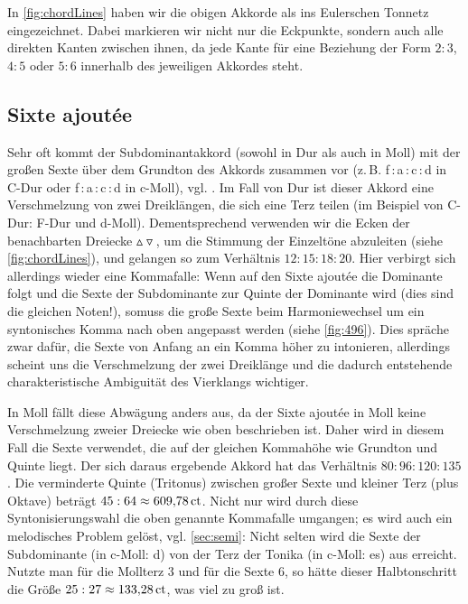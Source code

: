 In \cref{fig:chordLines} haben wir die obigen Akkorde als ins Eulerschen Tonnetz
eingezeichnet. Dabei markieren wir nicht nur die Eckpunkte, sondern auch alle
direkten Kanten zwischen ihnen, da jede Kante für eine Beziehung der Form $2:3$,
$4:5$ oder $5:6$ innerhalb des jeweiligen Akkordes steht.

\subsection{Sixte ajoutée}
\label{sec:sixte}

Sehr oft kommt der Subdominantakkord (sowohl in Dur als auch in Moll) mit der
großen Sexte über dem Grundton des Akkords zusammen vor
(z.\,B. f\,:\,a\,:\,c\,:\,d in C-Dur oder f\,:\,\flat a\,:\,c\,:\,d in c-Moll),
vgl. \cite[{}9.3]{Skript}.  Im Fall von Dur ist dieser Akkord eine Verschmelzung
von zwei Dreiklängen, die sich eine Terz teilen (im Beispiel von C-Dur: F-Dur
und d-Moll). Dementsprechend verwenden wir die Ecken der benachbarten Dreiecke
$\vartriangle\!\!\!\triangledown$, um die Stimmung der Einzeltöne abzuleiten
(siehe \cref{fig:chordLines}), und gelangen so zum Verhältnis
$12:15:18:20$. Hier verbirgt sich allerdings wieder eine Kommafalle: Wenn auf
den Sixte ajoutée die Dominante folgt und die Sexte der Subdominante zur Quinte
der Dominante wird (dies sind die gleichen Noten!), somuss die große Sexte beim
Harmoniewechsel um ein syntonisches Komma nach oben angepasst werden (siehe
\cref{fig:496}).  Dies spräche zwar dafür, die Sexte von Anfang an ein Komma
höher zu intonieren, allerdings scheint uns die Verschmelzung der zwei
Dreiklänge und die dadurch entstehende charakteristische Ambiguität des
Vierklangs wichtiger.

In Moll fällt diese Abwägung anders aus, da der Sixte ajoutée in Moll keine
Verschmelzung zweier Dreiecke wie oben beschrieben ist.  Daher wird in diesem
Fall die Sexte verwendet, die auf der gleichen Kommahöhe wie Grundton und Quinte
liegt. Der sich daraus ergebende Akkord hat das Verhältnis $80:96:120:135$.  Die
verminderte Quinte (Tritonus) zwischen großer Sexte und kleiner Terz (plus
Oktave) beträgt $45:64\approx 609{,}78\,\mathrm{ct}$.  Nicht nur wird durch diese
Syntonisierungswahl die oben genannte Kommafalle umgangen; es wird auch ein
melodisches Problem gelöst, vgl. \cref{sec:semi}: Nicht selten wird die Sexte
der Subdominante (in c-Moll: d) von der Terz der Tonika (in c-Moll: es) aus
erreicht.  Nutzte man für die Mollterz \flatp $3$ und für die Sexte \naturalp
$6$, so hätte dieser Halbtonschritt die Größe $25:27\approx 133{,}28\,\mathrm{ct}$,
was viel zu groß ist.

